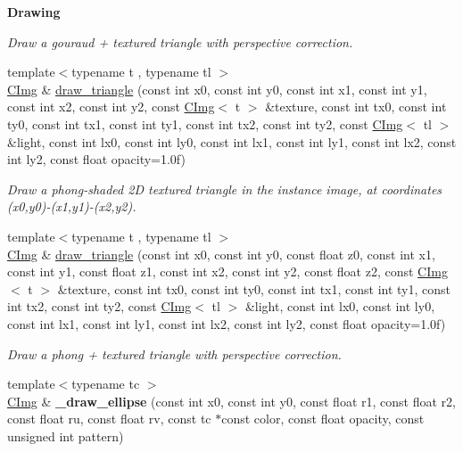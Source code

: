 \begin{Indent}{\bf Drawing}
\begin{DoxyCompactItemize}
\begin{DoxyCompactList}\small\item\em Draw a gouraud + textured triangle with perspective correction. \end{DoxyCompactList}\item 
{\footnotesize template$<$typename t , typename tl $>$ }\\\hyperlink{structcimg__library_1_1_c_img}{C\-Img} \& \hyperlink{structcimg__library_1_1_c_img_ac308bec04587a60dc775d90f761f3f43}{draw\-\_\-triangle} (const int x0, const int y0, const int x1, const int y1, const int x2, const int y2, const \hyperlink{structcimg__library_1_1_c_img}{C\-Img}$<$ t $>$ \&texture, const int tx0, const int ty0, const int tx1, const int ty1, const int tx2, const int ty2, const \hyperlink{structcimg__library_1_1_c_img}{C\-Img}$<$ tl $>$ \&light, const int lx0, const int ly0, const int lx1, const int ly1, const int lx2, const int ly2, const float opacity=1.\-0f)
\begin{DoxyCompactList}\small\item\em Draw a phong-\/shaded 2\-D textured triangle in the instance image, at coordinates ({\ttfamily x0},{\ttfamily y0})-\/({\ttfamily x1},{\ttfamily y1})-\/({\ttfamily x2},{\ttfamily y2}). \end{DoxyCompactList}\item 
\hypertarget{structcimg__library_1_1_c_img_a513ed6bf6eae13c6a5d3e30ba91b3aeb}{{\footnotesize template$<$typename t , typename tl $>$ }\\\hyperlink{structcimg__library_1_1_c_img}{C\-Img} \& \hyperlink{structcimg__library_1_1_c_img_a513ed6bf6eae13c6a5d3e30ba91b3aeb}{draw\-\_\-triangle} (const int x0, const int y0, const float z0, const int x1, const int y1, const float z1, const int x2, const int y2, const float z2, const \hyperlink{structcimg__library_1_1_c_img}{C\-Img}$<$ t $>$ \&texture, const int tx0, const int ty0, const int tx1, const int ty1, const int tx2, const int ty2, const \hyperlink{structcimg__library_1_1_c_img}{C\-Img}$<$ tl $>$ \&light, const int lx0, const int ly0, const int lx1, const int ly1, const int lx2, const int ly2, const float opacity=1.\-0f)}\label{structcimg__library_1_1_c_img_a513ed6bf6eae13c6a5d3e30ba91b3aeb}

\begin{DoxyCompactList}\small\item\em Draw a phong + textured triangle with perspective correction. \end{DoxyCompactList}\item 
\hypertarget{structcimg__library_1_1_c_img_a9eeb3f0522220afc0227082f6f94a72f}{{\footnotesize template$<$typename tc $>$ }\\\hyperlink{structcimg__library_1_1_c_img}{C\-Img} \& {\bfseries \-\_\-draw\-\_\-ellipse} (const int x0, const int y0, const float r1, const float r2, const float ru, const float rv, const tc $\ast$const color, const float opacity, const unsigned int pattern)}\label{structcimg__library_1_1_c_img_a9eeb3f0522220afc0227082f6f94a72f}


\end{DoxyCompactItemize}
\end{Indent}
